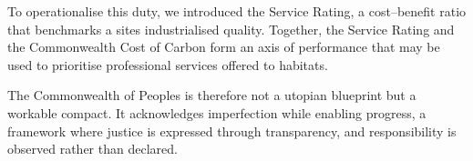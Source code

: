 To operationalise this duty, we introduced the Service Rating, a cost–benefit ratio that benchmarks a sites industrialised quality.
Together, the Service Rating and the Commonwealth Cost of Carbon form an axis of performance that may be used to prioritise professional services offered to habitats.

The Commonwealth of Peoples is therefore not a utopian blueprint but a workable compact.
It acknowledges imperfection while enabling progress, a framework where justice is expressed through transparency, and responsibility is observed rather than declared.\\